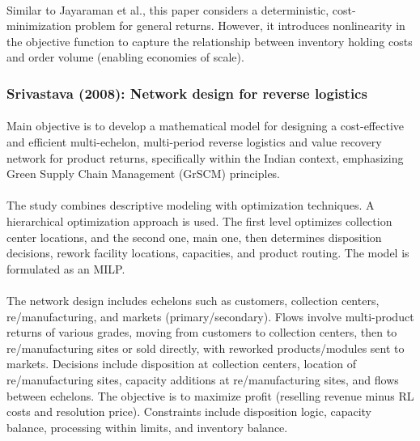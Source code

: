 \paragraph{} Similar to Jayaraman et al., this paper considers a deterministic, cost-minimization problem for general returns. However, it introduces nonlinearity in the objective function to capture the relationship between inventory holding costs and order volume (enabling economies of scale).

\subsubsection{Srivastava (2008): Network design for reverse logistics}

\paragraph{} Main objective is to develop a mathematical model for designing a cost-effective and efficient multi-echelon, multi-period reverse logistics and value recovery network for product returns, specifically within the Indian context, emphasizing Green Supply Chain Management (GrSCM) principles.

\paragraph{} The study combines descriptive modeling with optimization techniques. A hierarchical optimization approach is used. The first level optimizes collection center locations, and the second one, main one, then determines disposition decisions, rework facility locations, capacities, and product routing. The model is formulated as an MILP.

\paragraph{} The network design includes echelons such as customers, collection centers, re/manufacturing, and markets (primary/secondary). Flows involve multi-product returns of various grades, moving from customers to collection centers, then to re/manufacturing sites or sold directly, with reworked products/modules sent to markets. Decisions include disposition at collection centers, location of re/manufacturing sites, capacity additions at re/manufacturing sites, and flows between echelons. The objective is to maximize profit (reselling revenue minus RL costs and resolution price). Constraints include disposition logic, capacity balance, processing within limits, and inventory balance.

